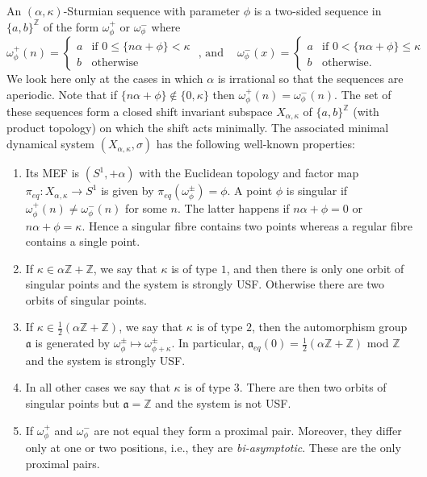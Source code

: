 \documentclass[10pt,a4paper]{amsart}
\numberwithin{equation}{section}
\newcommand{\Z}{\mathbb Z}
\newcommand{\aut}{{\mathfrak a}}
\newcommand{\aute}{\aut_{eq}}
\newcommand{\pe}{\pi_{eq}}
\newcommand{\al}{\alpha}
\newcommand{\cut}{\kappa}
\begin{document}
An $(\al,\cut)$-Sturmian sequence with parameter $\phi$ is a two-sided sequence in $\{a,b\}^\Z$ of the form $\omega_\phi^+$ or $\omega_\phi^-$ where 
$$\omega_\phi^+(n) = \left\{\begin{array}{ll}
\!\!	a & \!\! \mbox{if } 0 \leq \{n\al +\phi\} < \cut \\
\!\!	b &\!\! \mbox{otherwise} \end{array}
\right.\!\!\!\!\!\! \mbox{ , and }\:\:\:\:
\omega_\phi^-(x) = \left\{\begin{array}{ll}
\!\!	a & \!\!\mbox{if } 0 < \{n\al +\phi\} \leq \cut \\
\!\!	b &\!\! \mbox{otherwise.} \end{array}
\right.$$
We look here only at the cases in which $\alpha$ is irrational so that the sequences are aperiodic. Note that if $\{n\al+\phi\}\notin \{0,\kappa\}$ then 
$\omega_\phi^+(n) = \omega_\phi^-(n)$. The set of these sequences form a closed shift invariant subspace $X_{\al,\cut}$ of $\{a,b\}^\Z$ (with product topology) on which the shift acts minimally. The associated minimal dynamical system $(X_{\al,\cut},\sigma)$ has the following well-known properties:
\begin{enumerate}
\item Its MEF is $(S^1,+\al)$ with the Euclidean topology and factor map $\pe:X_{\al,\cut}\to S^1$ is given by $\pe(\omega_\phi^\pm) = \phi$. 
A point $\phi$ is singular if $\omega_\phi^+(n) \neq \omega_\phi^-(n)$ for some $n$. The latter happens if $n\al+\phi = 0$ or $n\al+\phi =\kappa$. 
Hence a singular fibre contains two points whereas a regular fibre contains a single point.
\item If $\cut \in \al\Z+\Z$, we say that $\kappa$ is of type $1$, and then there is only one orbit of singular points and the system is strongly USF. Otherwise there are two orbits of singular points.
\item If $\cut \in \frac12(\al\Z+\Z)$, we say that $\kappa$ is of type $2$, then the automorphism group $\aut$ is generated by $\omega_\phi^\pm \mapsto \omega_{\phi+\cut}^\pm$. In particular, 
$\aute(0) = \frac12(\al\Z+\Z)$ mod $\Z$ and the system is strongly USF.  
\item In all other cases we say that $\kappa$ is of type $3$. There are then two orbits of singular points but $\aut = \Z$ and the system is not USF. 
\item If $\omega_\phi^+$ and  $\omega_\phi^-$ are not equal they form a proximal pair. 
Moreover, they differ only at one or two positions, i.e., they are {\em bi-asymptotic}. These are the only proximal pairs.
\end{enumerate}
\end{document}
